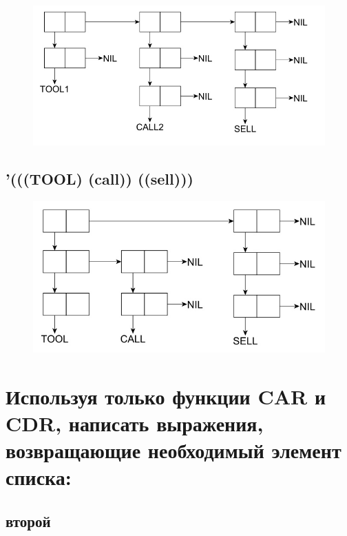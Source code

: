 \documentclass[a4paper,12pt]{article}
\begin{document}
	\begin{figure}[h!]
		\begin{center}
			{\includegraphics[scale = 0.4]{fifth.jpg}}
			\label{ris:5}
		\end{center}
	\end{figure}
	
	\subsection{'(((TOOL) (call)) ((sell)))}
	
	\begin{figure}[h!]
		\begin{center}
			{\includegraphics[scale = 0.4]{sixth.jpg}}
			\label{ris:6}
		\end{center}
	\end{figure}

\newpage
	
	\section{Используя только функции CAR и CDR, написать выражения, возвращающие необходимый элемент списка:}
	
	\subsection{второй}
	
\end{document}

